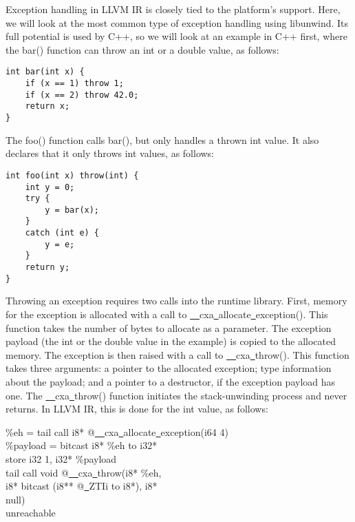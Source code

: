 Exception handling in LLVM IR is closely tied to the platform's support. Here, we will look at the most common type of exception handling using libunwind. Its full potential is used by C++, so we will look at an example in C++ first, where the bar() function can throw an int or a double value, as follows:\par

\begin{lstlisting}[caption={}]
int bar(int x) {
	if (x == 1) throw 1;
	if (x == 2) throw 42.0;
	return x;
}
\end{lstlisting}

The foo() function calls bar(), but only handles a thrown int value. It also declares that it only throws int values, as follows:\par

\begin{lstlisting}[caption={}]
int foo(int x) throw(int) {
	int y = 0;
	try {
		y = bar(x);
	}
	catch (int e) {
		y = e;
	}
	return y;
}
\end{lstlisting}

Throwing an exception requires two calls into the runtime library. First, memory for the exception is allocated with a call to \underline{~~}cxa\underline{~}allocate\underline{~}exception(). This function takes the number of bytes to allocate as a parameter. The exception payload (the int or the double value in the example) is copied to the allocated memory. The exception is then raised with a call to \underline{~~}cxa\underline{~}throw(). This function takes three arguments: a pointer to the allocated exception; type information about the payload; and a pointer to a destructor, if the exception payload has one. The \underline{~~}cxa\underline{~}throw() function initiates the stack-unwinding process and never returns. In LLVM IR, this is done for the int value, as follows:\par

\begin{tcolorbox}[colback=white,colframe=black]
\%eh = tail call i8* @\underline{~~}cxa\underline{~}allocate\underline{~}exception(i64 4) \\
\%payload = bitcast i8* \%eh to i32* \\
store i32 1, i32* \%payload \\
tail call void @\underline{~~}cxa\underline{~}throw(i8* \%eh, \\
\hspace*{3cm}i8* bitcast (i8** @\underline{~}ZTIi to i8*), i8* \\
\hspace*{3cm}null) \\
unreachable
\end{tcolorbox}

